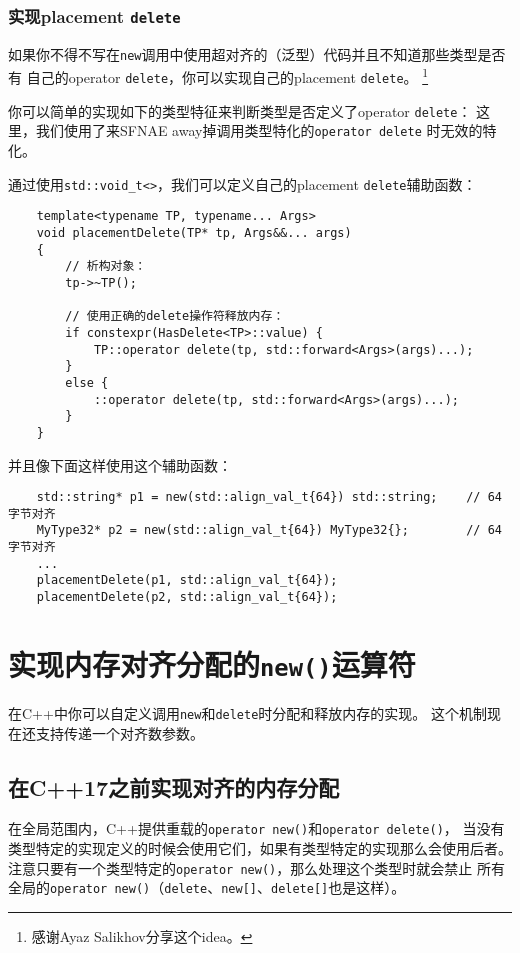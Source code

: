 \subsubsection{实现placement \texttt{delete}}\label{ch30.1.2.2}
如果你不得不写在\texttt{new}调用中使用超对齐的（泛型）代码并且不知道那些类型是否有
自己的operator \texttt{delete}，你可以实现自己的placement \texttt{delete}。
\footnote{感谢Ayaz Salikhov分享这个idea。}

你可以简单的实现如下的类型特征来判断类型是否定义了operator \texttt{delete}：
这里，我们使用了来SFNAE away掉调用类型特化的\texttt{operator delete}
时无效的特化。

通过使用\texttt{std::void\_t<>}，我们可以定义自己的placement \texttt{delete}辅助函数：
\begin{lstlisting}
    template<typename TP, typename... Args>
    void placementDelete(TP* tp, Args&&... args)
    {
        // 析构对象：
        tp->~TP();

        // 使用正确的delete操作符释放内存：
        if constexpr(HasDelete<TP>::value) {
            TP::operator delete(tp, std::forward<Args>(args)...);
        }
        else {
            ::operator delete(tp, std::forward<Args>(args)...);
        }
    }
\end{lstlisting}
并且像下面这样使用这个辅助函数：
\begin{lstlisting}
    std::string* p1 = new(std::align_val_t{64}) std::string;    // 64字节对齐
    MyType32* p2 = new(std::align_val_t{64}) MyType32{};        // 64字节对齐
    ...
    placementDelete(p1, std::align_val_t{64});
    placementDelete(p2, std::align_val_t{64});
\end{lstlisting}


\section{实现内存对齐分配的\texttt{new()}运算符}\label{ch30.2}
在C++中你可以自定义调用\texttt{new}和\texttt{delete}时分配和释放内存的实现。
这个机制现在还支持传递一个对齐数参数。

\subsection{在C++17之前实现对齐的内存分配}
在全局范围内，C++提供重载的\texttt{operator new()}和\texttt{operator delete()}，
当没有类型特定的实现定义的时候会使用它们，如果有类型特定的实现那么会使用后者。
注意只要有一个类型特定的\texttt{operator new()}，那么处理这个类型时就会禁止
所有全局的\texttt{operator new()}（\texttt{delete}、\texttt{new[]}、\texttt{delete[]}也是这样）。

